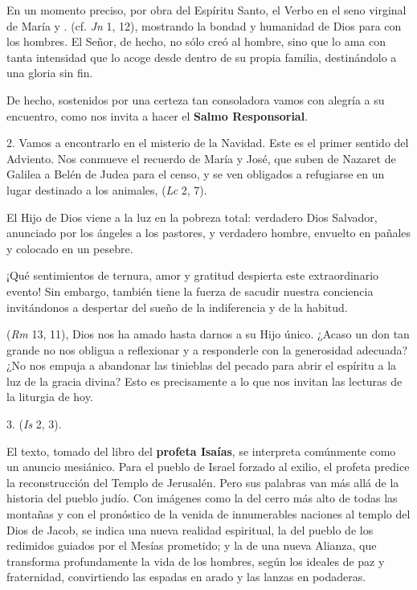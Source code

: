 \begin{body}
\begin{body}
		En un momento preciso, por obra del Espíritu Santo, el Verbo  en el seno virginal de María y . (cf. \emph{Jn} 1, 12), mostrando la bondad y humanidad de Dios para con los hombres. El Señor, de hecho, no sólo creó al hombre, sino que lo ama con tanta intensidad que lo acoge desde dentro de su propia familia, destinándolo a una gloria sin fin.
		
		De hecho, sostenidos por una certeza tan consoladora vamos con alegría a su encuentro, como nos invita a hacer el \textbf{Salmo Responsorial}.
		
		2. Vamos a encontrarlo en el misterio de la Navidad. Este es el primer sentido del Adviento. Nos conmueve el recuerdo de María y José, que suben de Nazaret de Galilea a Belén de Judea para el censo, y se ven obligados a refugiarse en un lugar destinado a los animales,  (\emph{Lc} 2, 7).
		
		El Hijo de Dios viene a la luz en la pobreza total: verdadero Dios Salvador, anunciado por los ángeles a los pastores, y verdadero hombre, envuelto en pañales y colocado en un pesebre.
		
		¡Qué sentimientos de ternura, amor y gratitud despierta este extraordinario evento! Sin embargo, también tiene la fuerza de sacudir nuestra conciencia invitándonos a despertar del sueño de la indiferencia y de la habitud.
		
		 (\emph{Rm} 13, 11), Dios nos ha amado hasta darnos a su Hijo único. ¿Acaso un don tan grande no nos obligua a reflexionar y a responderle con la generosidad adecuada? ¿No nos empuja a abandonar las tinieblas del pecado para abrir el espíritu a la luz de la gracia divina? Esto es precisamente a lo que nos invitan las lecturas de la liturgia de hoy.
		
		3.  (\emph{Is} 2, 3).
		
		El texto, tomado del libro del \textbf{profeta Isaías}, se interpreta comúnmente como un anuncio mesiánico. Para el pueblo de Israel forzado al exilio, el profeta predice la reconstrucción del Templo de Jerusalén. Pero sus palabras van más allá de la historia del pueblo judío. Con imágenes como la del cerro más alto de todas las montañas y con el pronóstico de la venida de innumerables naciones al templo del Dios de Jacob, se indica una nueva realidad espiritual, la del pueblo de los redimidos guiados por el Mesías prometido; y la de una nueva Alianza, que transforma profundamente la vida de los hombres, según los ideales de paz y fraternidad, convirtiendo las espadas en arado y las lanzas en podaderas.
		

\end{body}
\end{body}
